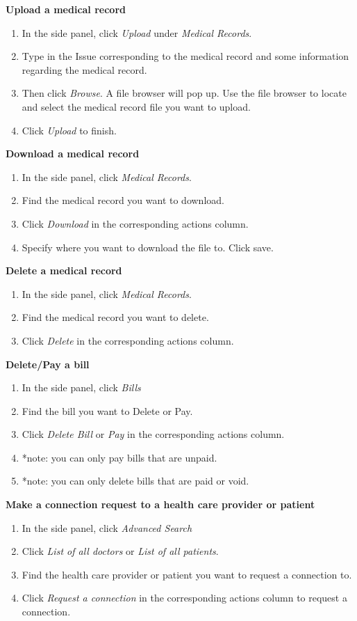 \textbf{Upload a medical record}
\begin{enumerate}
\item In the side panel, click \textit{Upload} under \textit{Medical Records}.
\item Type in the Issue corresponding to the medical record and some information regarding the medical record.
\item Then click \textit{Browse}. A file browser will pop up. Use the file browser to locate and select the medical record file you want to upload.
\item Click \textit{Upload} to finish.
\end{enumerate}
\textbf{Download a medical record}
\begin{enumerate}
\item In the side panel, click \textit{Medical Records}.
\item Find the medical record you want to download.
\item Click \textit{Download} in the corresponding actions column.
\item Specify where you want to download the file to. Click save.
\end{enumerate}
\textbf{Delete a medical record}
\begin{enumerate}
\item In the side panel, click \textit{Medical Records}.
\item Find the medical record you want to delete.
\item Click \textit{Delete} in the corresponding actions column.
\end{enumerate}
\textbf{Delete/Pay a bill}
\begin{enumerate}
\item In the side panel, click \textit{Bills}
\item Find the bill you want to Delete or Pay.
\item Click \textit{Delete Bill} or \textit{Pay} in the corresponding actions column.
\item *note: you can only pay bills that are unpaid.
\item *note: you can only delete bills that are paid or void.
\end{enumerate}
\textbf{Make a connection request to a health care provider or patient}
\begin{enumerate}
\item In the side panel, click \textit{Advanced Search}
\item Click \textit{List of all doctors} or \textit{List of all patients}.
\item Find the health care provider or patient you want to request a connection to.
\item Click \textit{Request a connection} in the corresponding actions column to request a connection.
\end{enumerate}
